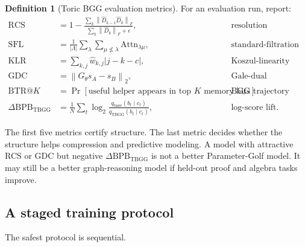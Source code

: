 \documentclass[11pt]{article}
\theoremstyle{definition}
\newtheorem{definition}{Definition}[section]
\theoremstyle{plain}
\theoremstyle{remark}
\numberwithin{equation}{section}
\newcommand{\norm}[1]{\left\lVert #1\right\rVert}
\newcommand{\abs}[1]{\left\lvert #1\right\rvert}
\begin{document}
\begin{definition}[Toric BGG evaluation metrics]\label{def:tbg-metrics}
For an evaluation run, report:
\begin{align}
  \mathrm{RCS} &= 1-\frac{\sum_k\norm{\widehat D_{k-1}\widehat D_k}_F}{\sum_k\norm{\widehat D_k}_F+\epsilon}, &&\text{resolution consistency,}\\
  \mathrm{SFL} &= \frac{1}{|\Lambda|}\sum_\lambda\sum_{\mu\not\leq\lambda}\mathrm{Attn}_{\lambda\mu}, &&\text{standard-filtration leakage,}\\
  \mathrm{KLR} &= \sum_{k,j}\widehat w_{k,j}\abs{j-k-c}, &&\text{Koszul-linearity residual,}\\
  \mathrm{GDC} &= \norm{G_\theta s_A-s_B}_2, &&\text{Gale-dual consistency,}\\
  \mathrm{BTR@}K &= \Pr[\text{useful helper appears in top }K\text{ memory hits}], &&\text{BGG trajectory retrieval,}\\
  \Delta\mathrm{BPB}_{\mathrm{TBGG}} &= \frac{1}{N}\sum_t\log_2\frac{q_{\mathrm{base}}(b_t\mid c_t)}{q_{\mathrm{TBGG}}(b_t\mid c_t)}, &&\text{log-score lift.}
\end{align}
\end{definition}

The first five metrics certify structure.  The last metric decides whether the structure helps compression and predictive modeling.  A model with attractive RCS or GDC but negative $\Delta\mathrm{BPB}_{\mathrm{TBGG}}$ is not a better Parameter-Golf model.  It may still be a better graph-reasoning model if held-out proof and algebra tasks improve.

\subsection{A staged training protocol}

The safest protocol is sequential.
\end{document}
